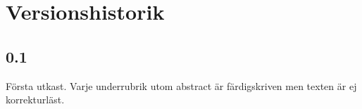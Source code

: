 \section*{Versionshistorik}
\subsection*{0.1}
Första utkast. Varje underrubrik utom abstract är färdigskriven men texten är ej korrekturläst.
